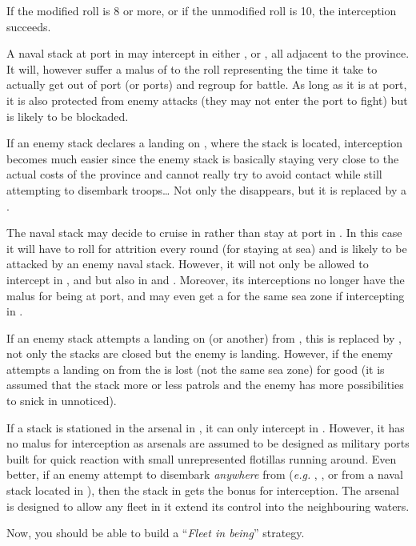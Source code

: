 If the modified roll is 8 or more, or if the unmodified roll is 10, the
interception succeeds.

\begin{exemple}
  A naval stack at port in \provinceCornwall may intercept in either
  \seazoneIrlande, \seazoneCeltique or \seazoneManche, all adjacent to the
  province. It will, however suffer a malus of  to the roll
  representing the time it take to actually get out of port (or ports) and
  regroup for battle. As long as it is at port, it is also protected from
  enemy attacks (they may not enter the port to fight) but is likely to be
  blockaded.

  If an enemy stack declares a landing on \provinceCornwall, where the stack
  is located, interception becomes much easier since the enemy stack is
  basically staying very close to the actual costs of the province and cannot
  really try to avoid contact while still attempting to disembark troops\ldots
  Not only the  disappears, but it is replaced by a .

  \smallskip

  The naval stack may decide to cruise in \seazoneCeltique rather than stay at
  port in \provinceCornwall. In this case it will have to roll for attrition
  every round (for staying at sea) and is likely to be attacked by an enemy
  naval stack. However, it will not only be allowed to intercept in
  \seazoneIrlande, \seazoneCeltique and \seazoneManche but also in
  \seazoneGascogne and \seazoneRockall. Moreover, its interceptions no longer
  have the  malus for being at port, and may even get a 
  for the same sea zone if intercepting in \seazoneCeltique.

  If an enemy stack attempts a landing on \provinceCornwall (or another) from
  \seazoneCeltique, this  is replaced by , not only the
  stacks are closed but the enemy is landing. However, if the enemy attempts a
  landing on \provinceCornwall from \seazoneManche the  is lost (not
  the same sea zone) for good (it is assumed that the stack more or less
  patrols and the enemy has more possibilities to snick in unnoticed).

  \smallskip

  If a stack is stationed in the \villePortsmouth arsenal in
  , it can only intercept in \seazoneManche. However, it has
  no malus for interception as arsenals are assumed to be designed as military
  ports built for quick reaction with small unrepresented flotillas running
  around. Even better, if an enemy attempt to disembark \emph{anywhere} from
  \seazoneManche (\emph{e.g.} \provinceWessex, \provinceNormandie,
  \provincePicardie or \provinceKent from a naval stack located in
  \seazoneManche), then the stack in \villePortsmouth gets the 
  bonus for interception. The arsenal is designed to allow any fleet in it
  extend its control into the neighbouring waters.

  \smallskip

  Now, you should be able to build a ``\emph{Fleet in being}'' strategy.
\end{exemple}

